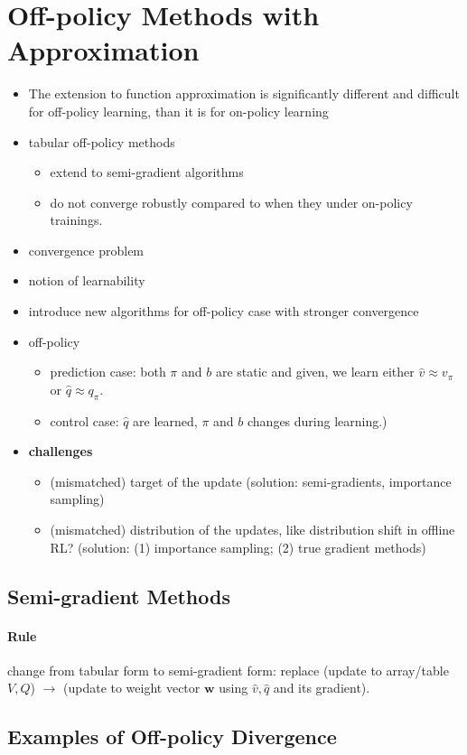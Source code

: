 \documentclass[sutton_barto_notes.tex]{subfiles}
\begin{document}
\newpage
\section{Off-policy Methods with Approximation}

\begin{itemize}
\item The extension to function approximation is significantly different and difficult for off-policy learning, than it is for on-policy learning
\item tabular off-policy methods
\begin{itemize}
	\item extend to semi-gradient algorithms
	\item do not converge robustly compared to when they under on-policy trainings.
\end{itemize}
\item convergence problem
\item notion of learnability
\item introduce new algorithms for off-policy case with stronger convergence
\item off-policy
\begin{itemize}
	\item prediction case: both $\pi$ and $b$ are static and given, we learn either $\hat{v} \approx v_\pi$ or $\hat{q}\approx q_\pi$.
	\item control case: $\hat{q}$ are learned, $\pi$ and $b$ changes during learning.)
\end{itemize}
\item \textbf{challenges}
\begin{itemize}
\item (mismatched) target of the update (solution: semi-gradients, importance sampling)
\item (mismatched) distribution of the updates, like distribution shift in offline RL? (solution: (1) importance sampling; (2) true gradient methods)
\end{itemize}
\end{itemize}

\subsection{Semi-gradient Methods}

\paragraph{Rule} change from tabular form to semi-gradient form: replace (update to array/table $V,Q$) $\rightarrow$ (update to weight vector $\bm{w}$ using $\hat{v},\hat{q}$ and its gradient).

\subsection{Examples of Off-policy Divergence}
\end{document}
